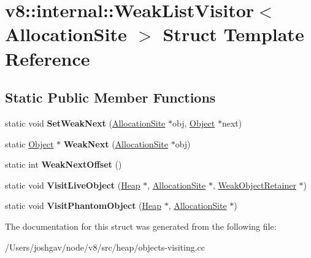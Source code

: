 \hypertarget{structv8_1_1internal_1_1_weak_list_visitor_3_01_allocation_site_01_4}{}\section{v8\+:\+:internal\+:\+:Weak\+List\+Visitor$<$ Allocation\+Site $>$ Struct Template Reference}
\label{structv8_1_1internal_1_1_weak_list_visitor_3_01_allocation_site_01_4}
\subsection*{Static Public Member Functions}
\begin{DoxyCompactItemize}
\item 
static void {\bfseries Set\+Weak\+Next} (\hyperlink{classv8_1_1internal_1_1_allocation_site}{Allocation\+Site} $\ast$obj, \hyperlink{classv8_1_1internal_1_1_object}{Object} $\ast$next)\hypertarget{structv8_1_1internal_1_1_weak_list_visitor_3_01_allocation_site_01_4_a6c05aafa103a399c030a6c24ba1d8c52}{}\label{structv8_1_1internal_1_1_weak_list_visitor_3_01_allocation_site_01_4_a6c05aafa103a399c030a6c24ba1d8c52}

\item 
static \hyperlink{classv8_1_1internal_1_1_object}{Object} $\ast$ {\bfseries Weak\+Next} (\hyperlink{classv8_1_1internal_1_1_allocation_site}{Allocation\+Site} $\ast$obj)\hypertarget{structv8_1_1internal_1_1_weak_list_visitor_3_01_allocation_site_01_4_aba201f71b26e8f687a75338730e921ca}{}\label{structv8_1_1internal_1_1_weak_list_visitor_3_01_allocation_site_01_4_aba201f71b26e8f687a75338730e921ca}

\item 
static int {\bfseries Weak\+Next\+Offset} ()\hypertarget{structv8_1_1internal_1_1_weak_list_visitor_3_01_allocation_site_01_4_a1d96c170e9e8c3ffff1c3fb771872662}{}\label{structv8_1_1internal_1_1_weak_list_visitor_3_01_allocation_site_01_4_a1d96c170e9e8c3ffff1c3fb771872662}

\item 
static void {\bfseries Visit\+Live\+Object} (\hyperlink{classv8_1_1internal_1_1_heap}{Heap} $\ast$, \hyperlink{classv8_1_1internal_1_1_allocation_site}{Allocation\+Site} $\ast$, \hyperlink{classv8_1_1internal_1_1_weak_object_retainer}{Weak\+Object\+Retainer} $\ast$)\hypertarget{structv8_1_1internal_1_1_weak_list_visitor_3_01_allocation_site_01_4_a48d8ab358cd311cef255165feddf430a}{}\label{structv8_1_1internal_1_1_weak_list_visitor_3_01_allocation_site_01_4_a48d8ab358cd311cef255165feddf430a}

\item 
static void {\bfseries Visit\+Phantom\+Object} (\hyperlink{classv8_1_1internal_1_1_heap}{Heap} $\ast$, \hyperlink{classv8_1_1internal_1_1_allocation_site}{Allocation\+Site} $\ast$)\hypertarget{structv8_1_1internal_1_1_weak_list_visitor_3_01_allocation_site_01_4_a795afdf40156d0af54722f2ba82f04dd}{}\label{structv8_1_1internal_1_1_weak_list_visitor_3_01_allocation_site_01_4_a795afdf40156d0af54722f2ba82f04dd}

\end{DoxyCompactItemize}


The documentation for this struct was generated from the following file\+:\begin{DoxyCompactItemize}
\item 
/\+Users/joshgav/node/v8/src/heap/objects-\/visiting.\+cc\end{DoxyCompactItemize}

